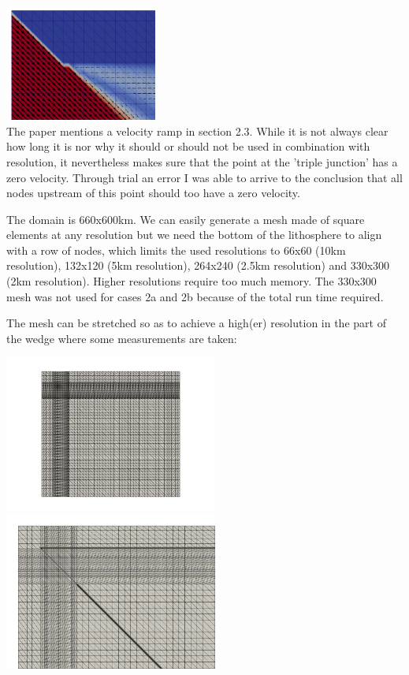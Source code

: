 \begin{center}
\includegraphics[width=5cm]{python_codes/fieldstone_68/results/case1a/vel_zoom}\\
{\captionfont The paper mentions a velocity ramp in section 2.3. While it is not 
always clear how long it is nor why it should or should not be used in combination
with resolution, it nevertheless makes sure that the point at the 'triple junction'
has a zero velocity. Through trial an error I was able to arrive to the conclusion that 
all nodes upstream of this point should too have a zero velocity.} 
\end{center}

The domain is 660x600km. We can easily generate a mesh made of square elements at any resolution 
but we need the bottom of the lithosphere to align with a row of nodes, which limits the 
used resolutions to 66x60 (10km resolution), 132x120 (5km resolution), 264x240 (2.5km resolution)
and 330x300 (2km resolution). Higher resolutions require too much memory. The 330x300 mesh was not 
used for cases 2a and 2b because of the total run time required.

The mesh can be stretched so as to achieve a high(er) resolution in the part of the wedge 
where some measurements are taken:
\begin{center}
\includegraphics[width=7cm]{python_codes/fieldstone_68/images/mesh_stretch}
\includegraphics[width=7cm]{python_codes/fieldstone_68/images/mesh_stretch_zoom}
\end{center}


